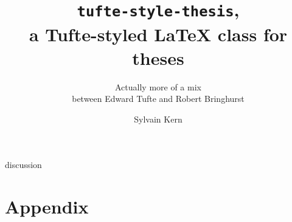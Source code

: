\documentclass[
    10pt,
	colorful,
	boxey,
 a4paper,
 parskip
]{tufte-style-thesis}
\author{Sylvain Kern}
\title{\texttt{tufte-style-thesis},\\a Tufte-styled \LaTeX{} class for theses}
\subtitle{Actually more of a mix\\between Edward Tufte and Robert Bringhurst}
\begin{document}
\ifdebug
    \layout
\fi


\frontmatter

%
%
%


\mainmatter

{discussion}


\backmatter

\thispagestyle{empty}
\printbibliography
\cleardoublepage

\part*{Appendix}

\setcounter{table}{0}
\setcounter{figure}{0}

\renewcommand{\thetable}{A\arabic{table}}  %
\renewcommand{\thefigure}{A\arabic{figure}}  %


\cleardoublepage


\begin{wide}
\thispagestyle{empty}
\printindex
\end{wide}
\end{document}
